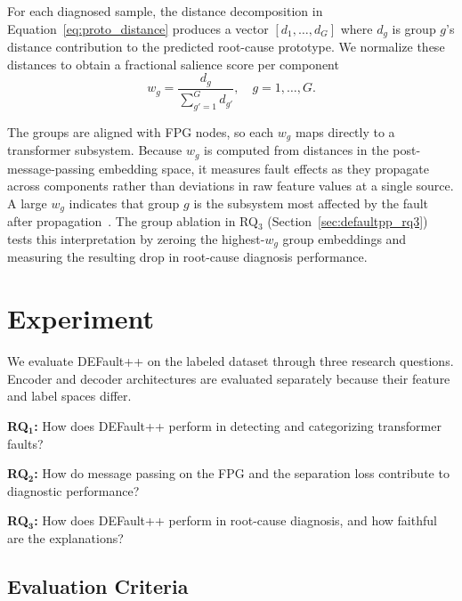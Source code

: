 For each diagnosed sample, the distance decomposition in Equation~\ref{eq:proto_distance} produces a vector $[d_1, \ldots, d_G]$ where $d_g$ is group $g$'s distance contribution to the predicted root-cause prototype. We normalize these distances to obtain a fractional salience score per component
\begin{equation}
w_g = \frac{d_g}{\sum_{g'=1}^{G} d_{g'}}, \quad g = 1, \ldots, G.
\label{eq:explanation}
\end{equation}

The groups are aligned with FPG nodes, so each $w_g$ maps directly to a transformer subsystem. Because $w_g$ is computed from distances in the post-message-passing embedding space, it measures fault effects as they propagate across components rather than deviations in raw feature values at a single source. A large $w_g$ indicates that group $g$ is the subsystem most affected by the fault after propagation~\cite{wolf2024keep}. The group ablation in RQ$_3$ (Section~\ref{sec:defaultpp_rq3}) tests this interpretation by zeroing the highest-$w_g$ group embeddings and measuring the resulting drop in root-cause diagnosis performance.

\section{Experiment}
\label{sec:defaultpp_experiment}

We evaluate DEFault++ on the labeled dataset through three research questions. Encoder and decoder architectures are evaluated separately because their feature and label spaces differ.

\begin{rqlist}
\item \textbf{RQ$\mathbf{_1}$:} How does DEFault++ perform in detecting and categorizing transformer faults?
\item \textbf{RQ$\mathbf{_2}$:} How do message passing on the FPG and the separation loss contribute to diagnostic performance?
\item \textbf{RQ$\mathbf{_3}$:} How does DEFault++ perform in root-cause diagnosis, and how faithful are the explanations?
\end{rqlist}

\subsection{Evaluation Criteria}
\label{sec:defaultpp_cv}

